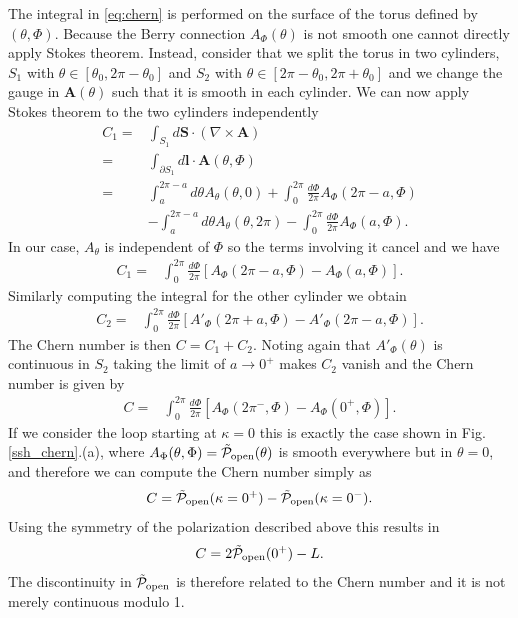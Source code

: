 \documentclass[twocolumn,amsmath,longbibliography,amssymb,superscriptaddress]{revtex4-1}
\begin{document}
The integral in \eqref{eq:chern} is performed on the surface of the torus defined by $(\theta,\Phi)$. Because the Berry connection $A_\Phi(\theta)$ is not smooth one cannot directly apply Stokes theorem. Instead, consider that we split the torus in two cylinders, $S_1$ with $\theta\in[\theta_0,2\pi-\theta_0]$ and  $S_2$ with $\theta\in[2\pi-\theta_0,2\pi+\theta_0]$ and we change the gauge in $\boldsymbol{A}(\theta)$ such that it is smooth in each cylinder. We can now apply Stokes theorem to the two cylinders independently
\begin{align*}
C_1 =& \int_{S_1} d\boldsymbol{S}\cdot (\nabla \times \boldsymbol{A}) \\
=& \int_{\partial S_1} d\boldsymbol{l}\cdot \boldsymbol{A}(\theta,\Phi) \\
=& \int_a^{2\pi-a} d\theta A_\theta(\theta,0) +\int_0^{2\pi} \frac{d\Phi}{2\pi} A_\Phi (2\pi-a,\Phi) \\
&-\int_a^{2\pi-a} d\theta A_\theta(\theta,2\pi) -\int_0^{2\pi} \frac{d\Phi}{2\pi} A_\Phi (a,\Phi).
\end{align*}
In our case, $A_\theta$ is independent of $\Phi$ so the terms involving it cancel and we have
\begin{align*}
C_1 =& \int_0^{2\pi} \frac{d\Phi}{2\pi} [A_\Phi (2\pi-a,\Phi) -A_\Phi (a,\Phi)].
\end{align*}
Similarly computing the integral for the other cylinder we obtain
\begin{align*}
C_2 =& \int_0^{2\pi} \frac{d\Phi}{2\pi} [A'_\Phi (2\pi+a,\Phi) -A'_\Phi (2\pi-a,\Phi)].
\end{align*}
The Chern number is then $C=C_1+C_2$. Noting again that $A'_\Phi(\theta)$ is continuous in $S_2$ taking the limit of $a\rightarrow 0^+$ makes $C_2$ vanish and the Chern number is given by
\begin{align*}
C =& \int_0^{2\pi} \frac{d\Phi}{2\pi} [A_\Phi (2\pi^-,\Phi) -A_\Phi (0^+,\Phi)].
\end{align*}
If we consider the loop starting at $\kappa = 0$ this is exactly the case shown in Fig.\ref{ssh_chern}.(a), where $A_\Phi (\theta,\Phi) = \tilde{\mathcal{P}}_{\rm open}(\theta)$ is smooth everywhere but in $\theta = 0$, and therefore we can compute the Chern number simply as 
\begin{align*}
C= \tilde{\mathcal{P}}_{\rm open}(\kappa=0^+)-\tilde{\mathcal{P}}_{\rm open}(\kappa=0^-).
\end{align*}
Using the symmetry of the polarization described above this results in 
\begin{align}
C= 2\tilde{\mathcal{P}}_{\rm open}(0^+)-L.
\label{eq:Chern_number}
\end{align}
The discontinuity in $\tilde{\mathcal{P}}_{\rm open}$ is therefore related to the Chern number and it is not merely continuous modulo 1. 
\end{document}
